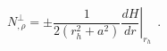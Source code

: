 \begin{equation}
N^{\perp}_{,\rho} = \pm\frac{1}{2(r_h^2+a^2)} \left.\frac{dH}{dr}\right|_{r_h} \ \ .
\label{a11}
\end{equation}

